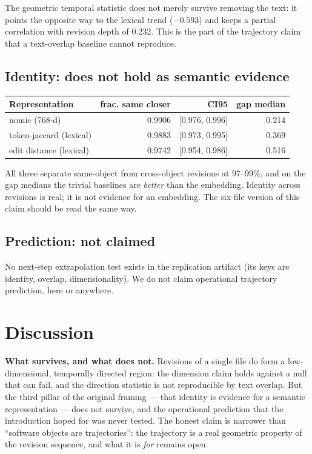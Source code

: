 \documentclass[11pt]{article}
\begin{document}
The geometric temporal statistic does not merely survive removing the text:
it points the opposite way to the lexical trend ($-0.593$) and keeps a
partial correlation with revision depth of 0.232. This is the part of the
trajectory claim that a text-overlap baseline cannot reproduce.

\subsection{Identity: does not hold as semantic evidence}

\begin{center}
\begin{tabular}{lrrr}
\toprule
\textbf{Representation} & \textbf{frac. same closer} & \textbf{CI95} & \textbf{gap median} \\
\midrule
nomic (768-d) & 0.9906 & [0.976, 0.996] & 0.214 \\
token-jaccard (lexical) & 0.9883 & [0.973, 0.995] & 0.369 \\
edit distance (lexical) & 0.9742 & [0.954, 0.986] & 0.516 \\
\bottomrule
\end{tabular}
\end{center}

All three separate same-object from cross-object revisions at 97--99\%, and
on the gap medians the trivial baselines are \emph{better} than the
embedding. Identity across revisions is real; it is not evidence for an
embedding. The six-file version of this claim should be read the same way.

\subsection{Prediction: not claimed}

No next-step extrapolation test exists in the replication artifact (its keys
are identity, overlap, dimensionality). We do not claim operational
trajectory prediction, here or anywhere.

\section{Discussion}

\textbf{What survives, and what does not.} Revisions of a single file do
form a low-dimensional, temporally directed region: the dimension claim holds
against a null that can fail, and the direction statistic is not reproducible
by text overlap. But the third pillar of the original framing --- that
identity is evidence for a semantic representation --- does not survive, and
the operational prediction that the introduction hoped for was never tested.
The honest claim is narrower than ``software objects are trajectories'': the
trajectory is a real geometric property of the revision sequence, and what it
is \emph{for} remains open.
\end{document}
